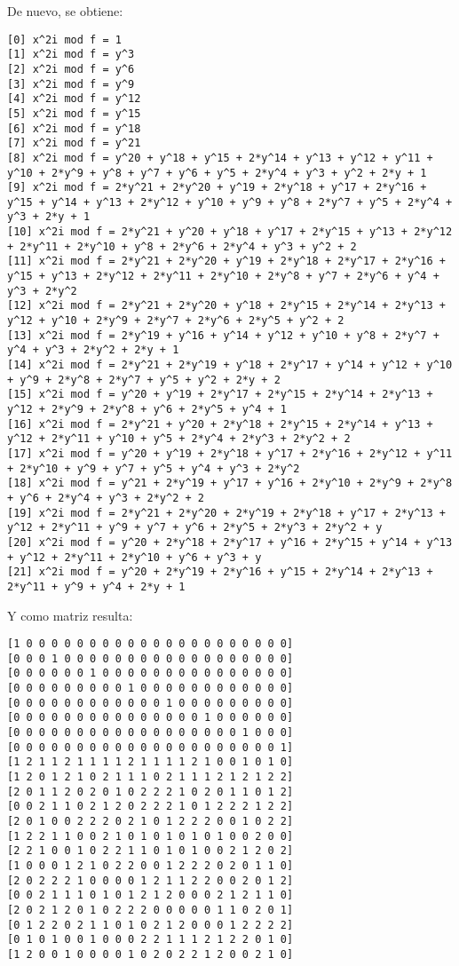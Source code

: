 \documentclass[a4paper]{article}
\begin{document}
De nuevo, se obtiene:

\begin{verbatim}
[0] x^2i mod f = 1
[1] x^2i mod f = y^3
[2] x^2i mod f = y^6
[3] x^2i mod f = y^9
[4] x^2i mod f = y^12
[5] x^2i mod f = y^15
[6] x^2i mod f = y^18
[7] x^2i mod f = y^21
[8] x^2i mod f = y^20 + y^18 + y^15 + 2*y^14 + y^13 + y^12 + y^11 + y^10 + 2*y^9 + y^8 + y^7 + y^6 + y^5 + 2*y^4 + y^3 + y^2 + 2*y + 1
[9] x^2i mod f = 2*y^21 + 2*y^20 + y^19 + 2*y^18 + y^17 + 2*y^16 + y^15 + y^14 + y^13 + 2*y^12 + y^10 + y^9 + y^8 + 2*y^7 + y^5 + 2*y^4 + y^3 + 2*y + 1
[10] x^2i mod f = 2*y^21 + y^20 + y^18 + y^17 + 2*y^15 + y^13 + 2*y^12 + 2*y^11 + 2*y^10 + y^8 + 2*y^6 + 2*y^4 + y^3 + y^2 + 2
[11] x^2i mod f = 2*y^21 + 2*y^20 + y^19 + 2*y^18 + 2*y^17 + 2*y^16 + y^15 + y^13 + 2*y^12 + 2*y^11 + 2*y^10 + 2*y^8 + y^7 + 2*y^6 + y^4 + y^3 + 2*y^2
[12] x^2i mod f = 2*y^21 + 2*y^20 + y^18 + 2*y^15 + 2*y^14 + 2*y^13 + y^12 + y^10 + 2*y^9 + 2*y^7 + 2*y^6 + 2*y^5 + y^2 + 2
[13] x^2i mod f = 2*y^19 + y^16 + y^14 + y^12 + y^10 + y^8 + 2*y^7 + y^4 + y^3 + 2*y^2 + 2*y + 1
[14] x^2i mod f = 2*y^21 + 2*y^19 + y^18 + 2*y^17 + y^14 + y^12 + y^10 + y^9 + 2*y^8 + 2*y^7 + y^5 + y^2 + 2*y + 2
[15] x^2i mod f = y^20 + y^19 + 2*y^17 + 2*y^15 + 2*y^14 + 2*y^13 + y^12 + 2*y^9 + 2*y^8 + y^6 + 2*y^5 + y^4 + 1
[16] x^2i mod f = 2*y^21 + y^20 + 2*y^18 + 2*y^15 + 2*y^14 + y^13 + y^12 + 2*y^11 + y^10 + y^5 + 2*y^4 + 2*y^3 + 2*y^2 + 2
[17] x^2i mod f = y^20 + y^19 + 2*y^18 + y^17 + 2*y^16 + 2*y^12 + y^11 + 2*y^10 + y^9 + y^7 + y^5 + y^4 + y^3 + 2*y^2
[18] x^2i mod f = y^21 + 2*y^19 + y^17 + y^16 + 2*y^10 + 2*y^9 + 2*y^8 + y^6 + 2*y^4 + y^3 + 2*y^2 + 2
[19] x^2i mod f = 2*y^21 + 2*y^20 + 2*y^19 + 2*y^18 + y^17 + 2*y^13 + y^12 + 2*y^11 + y^9 + y^7 + y^6 + 2*y^5 + 2*y^3 + 2*y^2 + y
[20] x^2i mod f = y^20 + 2*y^18 + 2*y^17 + y^16 + 2*y^15 + y^14 + y^13 + y^12 + 2*y^11 + 2*y^10 + y^6 + y^3 + y
[21] x^2i mod f = y^20 + 2*y^19 + 2*y^16 + y^15 + 2*y^14 + 2*y^13 + 2*y^11 + y^9 + y^4 + 2*y + 1
\end{verbatim}

Y como matriz resulta:

\begin{verbatim}
[1 0 0 0 0 0 0 0 0 0 0 0 0 0 0 0 0 0 0 0 0 0]
[0 0 0 1 0 0 0 0 0 0 0 0 0 0 0 0 0 0 0 0 0 0]
[0 0 0 0 0 0 1 0 0 0 0 0 0 0 0 0 0 0 0 0 0 0]
[0 0 0 0 0 0 0 0 0 1 0 0 0 0 0 0 0 0 0 0 0 0]
[0 0 0 0 0 0 0 0 0 0 0 0 1 0 0 0 0 0 0 0 0 0]
[0 0 0 0 0 0 0 0 0 0 0 0 0 0 0 1 0 0 0 0 0 0]
[0 0 0 0 0 0 0 0 0 0 0 0 0 0 0 0 0 0 1 0 0 0]
[0 0 0 0 0 0 0 0 0 0 0 0 0 0 0 0 0 0 0 0 0 1]
[1 2 1 1 2 1 1 1 1 2 1 1 1 1 2 1 0 0 1 0 1 0]
[1 2 0 1 2 1 0 2 1 1 1 0 2 1 1 1 2 1 2 1 2 2]
[2 0 1 1 2 0 2 0 1 0 2 2 2 1 0 2 0 1 1 0 1 2]
[0 0 2 1 1 0 2 1 2 0 2 2 2 1 0 1 2 2 2 1 2 2]
[2 0 1 0 0 2 2 2 0 2 1 0 1 2 2 2 0 0 1 0 2 2]
[1 2 2 1 1 0 0 2 1 0 1 0 1 0 1 0 1 0 0 2 0 0]
[2 2 1 0 0 1 0 2 2 1 1 0 1 0 1 0 0 2 1 2 0 2]
[1 0 0 0 1 2 1 0 2 2 0 0 1 2 2 2 0 2 0 1 1 0]
[2 0 2 2 2 1 0 0 0 0 1 2 1 1 2 2 0 0 2 0 1 2]
[0 0 2 1 1 1 0 1 0 1 2 1 2 0 0 0 2 1 2 1 1 0]
[2 0 2 1 2 0 1 0 2 2 2 0 0 0 0 0 1 1 0 2 0 1]
[0 1 2 2 0 2 1 1 0 1 0 2 1 2 0 0 0 1 2 2 2 2]
[0 1 0 1 0 0 1 0 0 0 2 2 1 1 1 2 1 2 2 0 1 0]
[1 2 0 0 1 0 0 0 0 1 0 2 0 2 2 1 2 0 0 2 1 0]
\end{verbatim}
\end{document}
